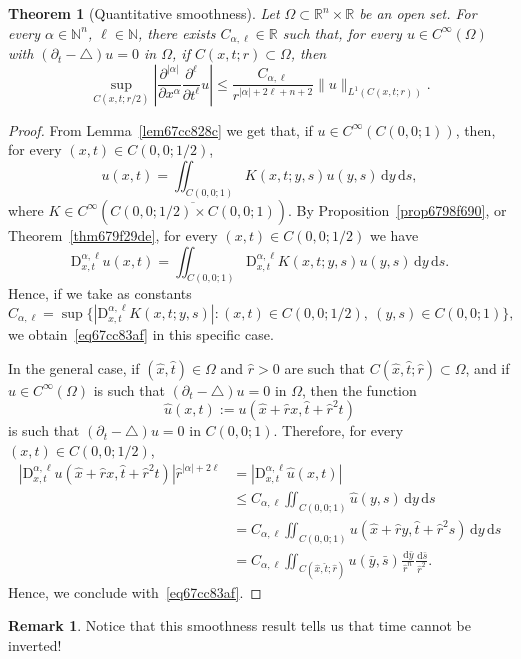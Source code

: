 \documentclass[a4paper,9pt]{amsart}
\newcommand{\N}{\mathbb{N}}	%
\newcommand{\R}{\mathbb{R}}	%
\newcommand{\did}{\,\mathrm{d}}	%
\newcommand{\de}{\partial}		%
\newcommand{\Diff}{\mathrm{D}}
\newcommand{\laplacian}{\triangle}
\theoremstyle{plain}
\newtheorem{theorem}[proposition]{Theorem}
\theoremstyle{definition}
\newtheorem{remark}[proposition]{Remark}
\theoremstyle{remark}
\begin{document}
{%
\begin{theorem}[Quantitative smoothness]\label{thm67cc82d1}
	Let $\Omega\subset\R^n\times\R$ be an open set.
	For every $\alpha\in\N^n$, $\ell\in\N$, there exists $C_{\alpha,\ell}\in\R$
	such that, for every $u\in C^\infty(\Omega)$ with $(\de_t-\laplacian)u=0$ in $\Omega$,
	if $C(x,t;r)\subset \Omega$, then
	\begin{equation}\label{eq67cc83af}
		\sup_{C(x,t;r/2)} \left| \frac{\de^{|\alpha|}}{\de x^\alpha} \frac{\de^\ell}{\de t^\ell} u \right|
		\le 
		\frac{C_{\alpha,\ell}}{r^{|\alpha|+2\ell+n+2}} \|u\|_{L^1(C(x,t;r))} .
	\end{equation}
\end{theorem}
\begin{proof}
	From Lemma~\ref{lem67cc828c} we get that, if $u\in C^\infty(C(0,0;1))$, then, 
	for every $(x,t)\in C(0,0;1/2)$, 
	\begin{equation}
		u(x,t) = \iint_{C(0,0;1)} K(x,t;y,s) u(y,s) \did y\did s ,
	\end{equation}
	where $K\in C^\infty(\overline{C(0,0;1/2)\times C(0,0;1)})$.
	By Proposition~\ref{prop6798f690}, or Theorem~\ref{thm679f29de},
	for every $(x,t)\in C(0,0;1/2)$ we have
	\begin{equation}
		\Diff^{\alpha,\ell}_{x,t}u(x,t) = \iint_{C(0,0;1)} \Diff^{\alpha,\ell}_{x,t}K(x,t;y,s) u(y,s) \did y\did s .
	\end{equation}
	Hence, if we take as constants
	\begin{equation}
		C_{\alpha,\ell} 
		= \sup\{ |\Diff^{\alpha,\ell}_{x,t}K(x,t;y,s)| : (x,t)\in C(0,0;1/2),\ (y,s)\in C(0,0;1) \},
	\end{equation}
	we obtain~\eqref{eq67cc83af} in this specific case.
	
	In the general case, if $(\hat x,\hat t)\in \Omega$ and $\hat r>0$ are such that $C(\hat x,\hat t;\hat r)\subset\Omega$, and if $u\in C^\infty(\Omega)$ is such that $(\de_t-\laplacian)u=0$ in $\Omega$,
	then the function
	\begin{equation}
		\hat u(x,t) := u(\hat x+\hat r x, \hat t + \hat r^2 t) 
	\end{equation}
	is such that $(\de_t-\laplacian)u=0$ in $C(0,0;1)$.
	Therefore, for every $(x,t) \in C(0,0;1/2)$,
	\begin{align*}
	 	|\Diff^{\alpha,\ell}_{x,t}u(\hat x+\hat r x,\hat t + \hat r^2 t )| \hat r^{|\alpha| + 2\ell}
		&= |\Diff^{\alpha,\ell}_{x,t} \hat u(x,t)| \\
		&\le C_{\alpha,\ell} \iint_{C(0,0;1)} \hat u(y,s) \did y\did s \\
		&= C_{\alpha,\ell} \iint_{C(0,0;1)}  u(\hat x+\hat r y,\hat t + \hat r^2 s) \did y\did s \\
		&= C_{\alpha,\ell} \iint_{C(\hat x,\hat t;\hat r)} u(\bar y,\bar s) \frac{\did \bar y}{\hat r^n} \frac{\did \bar s}{\hat r^2} .
	\end{align*}
	Hence, we conclude with~\eqref{eq67cc83af}.
\end{proof}

\begin{remark}
	Notice that this smoothness result tells us that time cannot be inverted!
\end{remark}
}
\end{document}
